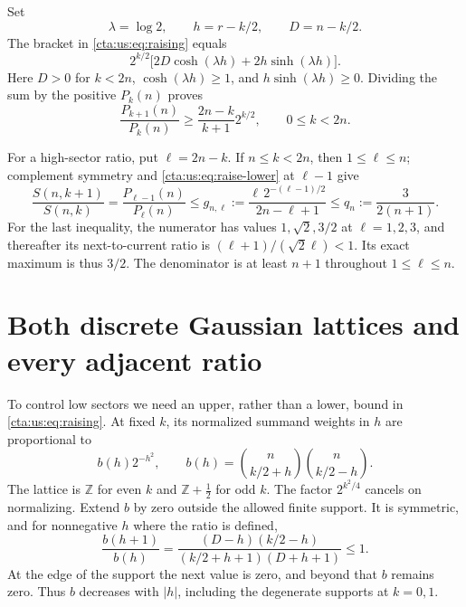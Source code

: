 \documentclass[11pt]{article}
\theoremstyle{definition}
\theoremstyle{remark}
\newcommand{\Z}{\mathbb Z}
\newcommand{\la}{\lambda}
\begin{document}
Set
\[
 \la=\log2,\qquad h=r-k/2,\qquad D=n-k/2.
\]
The bracket in \eqref{cta:us:eq:raising} equals
\begin{equation}\label{cta:us:eq:hyperbolic}
 2^{k/2}\bigl[2D\cosh(\la h)+2h\sinh(\la h)\bigr].
\end{equation}
Here $D>0$ for $k<2n$, $\cosh(\la h)\ge1$, and
$h\sinh(\la h)\ge0$. Dividing the sum by the positive $P_k(n)$ proves
\begin{equation}\label{cta:us:eq:raise-lower}
 \frac{P_{k+1}(n)}{P_k(n)}\ge
 \frac{2n-k}{k+1}2^{k/2},\qquad 0\le k<2n.
\end{equation}

For a high-sector ratio, put $\ell=2n-k$. If $n\le k<2n$, then
$1\le\ell\le n$; complement symmetry and \eqref{cta:us:eq:raise-lower} at
$\ell-1$ give
\begin{equation}\label{cta:us:eq:g}
 \frac{S(n,k+1)}{S(n,k)}
 =\frac{P_{\ell-1}(n)}{P_\ell(n)}
 \le g_{n,\ell}:=
 \frac{\ell\,2^{-(\ell-1)/2}}{2n-\ell+1}
 \le q_n:=\frac{3}{2(n+1)}.
\end{equation}
For the last inequality, the numerator has values $1,\sqrt2,3/2$ at
$\ell=1,2,3$, and thereafter its next-to-current ratio is
$(\ell+1)/(\sqrt2\ell)<1$. Its exact maximum is thus $3/2$.
The denominator is at least $n+1$ throughout $1\le\ell\le n$.

\section{Both discrete Gaussian lattices and every adjacent ratio}\label{cta:us:sec:gaussian}

To control low sectors we need an upper, rather than a lower, bound in
\eqref{cta:us:eq:raising}. At fixed $k$, its normalized summand weights in $h$
are proportional to
\begin{equation}\label{cta:us:eq:weighted-gaussian}
 b(h)2^{-h^2},\qquad
 b(h)=\binom n{k/2+h}\binom n{k/2-h}.
\end{equation}
The lattice is $\Z$ for even $k$ and $\Z+\tfrac12$ for odd $k$.
The factor $2^{k^2/4}$ cancels on normalizing. Extend $b$ by zero outside
the allowed finite support. It is symmetric, and for nonnegative $h$
where the ratio is defined,
\begin{equation}\label{cta:us:eq:bmono}
 \frac{b(h+1)}{b(h)}
 =\frac{(D-h)(k/2-h)}{(k/2+h+1)(D+h+1)}\le1.
\end{equation}
At the edge of the support the next value is zero, and beyond that
$b$ remains zero. Thus $b$ decreases with $|h|$, including the
degenerate supports at $k=0,1$.
\end{document}
